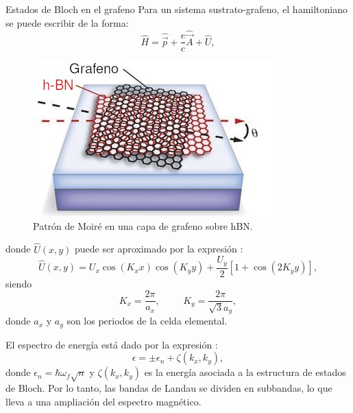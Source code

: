 \begin{frame}{Estados de Bloch en el grafeno}
	Para un sistema sustrato-grafeno, el hamiltoniano se puede escribir de la forma:
	\begin{equation}
			\hat{H} = \hat{\vec{p}}+\frac{e}{c}\hat{\vec{A}} + \hat{U},
	\end{equation}

	\begin{figure}[t]
		\centering
		\includegraphics[scale=0.4]{graficas/Moire.jpg}
		\caption{Patrón de Moiré en una capa de grafeno sobre hBN.}
		\label{moire}
	\end{figure}
\end{frame}

\begin{frame}
	donde $\hat{U}(x,y)$ puede ser aproximado por la expresión \cite{Wang2004}:
	\begin{equation}
			\hat{U}(x,y)=U_{x}\cos (K_{x}x)\cos (K_{y}y)+\frac{U_{y}}{2}\left[ 1+\cos (2K_{y}y)\right],
	\end{equation}
	siendo
	\begin{equation}
		K_{x}=\frac{2\pi}{a_{x}},\hspace{1cm}K_{y}=\frac{2\pi}{\sqrt{3}a_{y}},
	\end{equation}
	donde $a_x$ y $a_y$ son los periodos de la celda elemental.
\end{frame}

\begin{frame}
	El espectro de energía está dado por la expresión \cite{Wang2004}:
	\begin{equation}
			\epsilon = \pm \epsilon_n + \zeta(k_x,k_y),
	\end{equation}
	donde $\epsilon_n = \hbar\omega_f\sqrt n $ y
	$\zeta(k_x,k_y)$ es la energía asociada a la estructura de estados de Bloch.
	Por lo tanto, las bandas de Landau se dividen en subbandas,
	lo que lleva a una ampliación del espectro magnético.
\end{frame}


